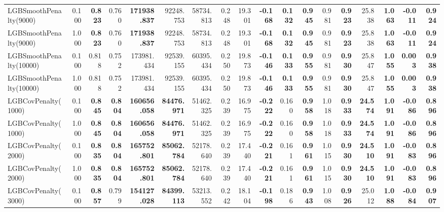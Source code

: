 \documentclass[11pt]{article}
\theoremstyle{plain}
\theoremstyle{definition}
\newcommand{\1}{\mathbf{1}}
\begin{document}
\begin{table}[htbp]
{\begin{tabular}{lrrrrrrrrrrrrrrrrr}
LGBSmoothPenalty(9000) & 0.100 & \textbf{0.823} & 0.760 & \textbf{171938.837} & 92248.753 & 58734.813 & 0.248 & 19.301 & \textbf{-0.168} & \textbf{0.132} & \textbf{0.945} & 0.981 & \textbf{0.923} & 25.838 & \textbf{1.063} & \textbf{-0.011} & \textbf{0.924} \\
LGBSmoothPenalty(9000) & 1.000 & \textbf{0.823} & 0.760 & \textbf{171938.837} & 92248.753 & 58734.813 & 0.248 & 19.301 & \textbf{-0.168} & \textbf{0.132} & \textbf{0.945} & 0.981 & \textbf{0.923} & 25.838 & \textbf{1.063} & \textbf{-0.011} & \textbf{0.924} \\
LGBSmoothPenalty(10000) & 0.100 & 0.818 & 0.752 & 173981.434 & 92539.155 & 60395.434 & 0.250 & 19.873 & \textbf{-0.146} & \textbf{0.133} & \textbf{0.955} & 0.981 & \textbf{0.930} & 25.847 & \textbf{1.055} & \textbf{0.003} & \textbf{0.938} \\
LGBSmoothPenalty(10000) & 1.000 & 0.818 & 0.752 & 173981.434 & 92539.155 & 60395.434 & 0.250 & 19.873 & \textbf{-0.146} & \textbf{0.133} & \textbf{0.955} & 0.981 & \textbf{0.930} & 25.847 & \textbf{1.055} & \textbf{0.003} & \textbf{0.938} \\
\hline
LGBCovPenalty(1000) & 0.100 & \textbf{0.845} & \textbf{0.804} & \textbf{160656.058} & \textbf{84476.971} & 51462.325 & 0.239 & 16.975 & \textbf{-0.222} & 0.160 & \textbf{0.958} & 1.018 & \textbf{0.933} & \textbf{24.574} & \textbf{1.091} & \textbf{-0.086} & \textbf{0.896} \\
LGBCovPenalty(1000) & 1.000 & \textbf{0.845} & \textbf{0.804} & \textbf{160656.058} & \textbf{84476.971} & 51462.325 & 0.239 & 16.975 & \textbf{-0.222} & 0.160 & \textbf{0.958} & 1.018 & \textbf{0.933} & \textbf{24.574} & \textbf{1.091} & \textbf{-0.086} & \textbf{0.896} \\
LGBCovPenalty(2000) & 0.100 & \textbf{0.835} & \textbf{0.804} & \textbf{165752.801} & \textbf{85062.784} & 52178.640 & 0.239 & 17.440 & \textbf{-0.221} & 0.161 & \textbf{0.961} & 1.015 & \textbf{0.930} & \textbf{24.510} & \textbf{1.091} & \textbf{-0.083} & \textbf{0.896} \\
LGBCovPenalty(2000) & 1.000 & \textbf{0.835} & \textbf{0.804} & \textbf{165752.801} & \textbf{85062.784} & 52178.640 & 0.239 & 17.440 & \textbf{-0.221} & 0.161 & \textbf{0.961} & 1.015 & \textbf{0.930} & \textbf{24.510} & \textbf{1.091} & \textbf{-0.083} & \textbf{0.896} \\
LGBCovPenalty(3000) & 0.100 & \textbf{0.857} & 0.799 & \textbf{154127.028} & \textbf{84399.113} & 53213.552 & 0.242 & 18.104 & \textbf{-0.198} & 0.186 & \textbf{0.943} & 1.008 & \textbf{0.926} & 25.012 & \textbf{1.088} & \textbf{-0.084} & \textbf{0.907} \\

\end{tabular}}
\end{table}
\end{document}
